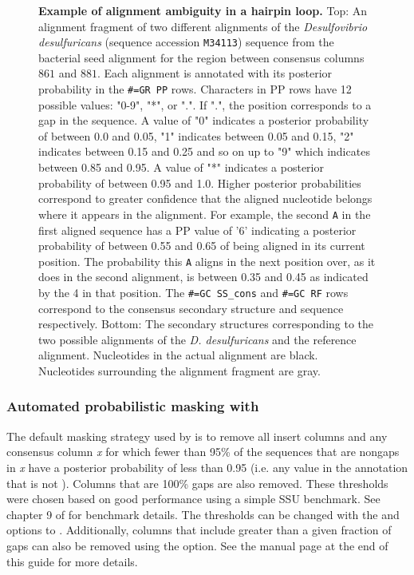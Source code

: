 \begin{figure}
\begin{center}
\caption[Example of alignment ambiguity in a hairpin loop.]{
  \textbf{Example of alignment ambiguity in a hairpin loop.}  Top: An
  alignment fragment of two different alignments of the
  \emph{Desulfovibrio desulfuricans} (sequence accession
  \texttt{M34113}) sequence from the  bacterial seed
  alignment for the region between consensus columns $861$ and $881$.
  Each alignment is annotated with its posterior probability in the
  \texttt{\#=GR PP} rows.  Characters in PP rows have 12 possible
  values: "0-9", "*", or ".". If ".", the position corresponds to a
  gap in the sequence. A value of "0" indicates a posterior
  probability of between 0.0 and 0.05, "1" indicates between 0.05 and
  0.15, "2" indicates between 0.15 and 0.25 and so on up to "9" which
  indicates between 0.85 and 0.95. A value of "*" indicates a
  posterior probability of between 0.95 and 1.0. Higher posterior
  probabilities correspond to greater confidence that the aligned
  nucleotide belongs where it appears in the alignment.  For example,
  the second \texttt{A} in the first aligned sequence has a PP value
  of '6' indicating a posterior probability of between 0.55 and 0.65
  of being aligned in its current position. The
  probability this \texttt{A} aligns in the next position over, as it
  does in the second alignment, is between 0.35 and 0.45 as indicated
  by the 4 in that position.  The \texttt{\#=GC
  SS\_cons} and \texttt{\#=GC RF} rows correspond to the consensus
  secondary structure and sequence respectively.  
  Bottom: The
  secondary structures corresponding to the two possible alignments of
  the \emph{D. desulfuricans} and the reference alignment.  Nucleotides
  in the actual alignment are black. Nucleotides surrounding the
  alignment fragment are gray.}
\end{center}
\label{fig:ambiguity}
\end{figure}

\subsubsection{Automated probabilistic masking with }

The default masking strategy used by  is to remove all
insert columns and any consensus column \emph{x} for which fewer than 95\% of
the sequences that are nongaps in \emph{x} have a posterior
probability of less than 0.95 (i.e. any value in the 
annotation that is not \prog{*}). Columns that are 100\% gaps are also
removed. These thresholds were chosen based on good performance using
a simple SSU benchmark. See chapter 9 of \cite{Nawrocki09} for
benchmark details. The thresholds can be changed with the  and
 options to . Additionally, columns that include
greater than a given fraction of gaps can also be removed using the
 option. See the  manual page at the
end of this guide for more details.

